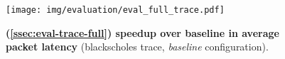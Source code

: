 \begin{figure}[h]
\centering
\captionsetup{justification=centering}
\texttt{[image: img/evaluation/eval\_full\_trace.pdf]}
\caption{\textbf{(\textsection \ref{ssec:eval-trace-full}) speedup over baseline in average packet latency} (blackscholes trace, \textit{baseline} configuration).}
\label{fig:eval-trace-full}
\end{figure}
